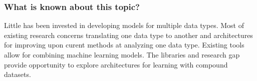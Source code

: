 \subsubsection{What is known about this topic?}

Little has been invested in developing models for multiple data types. Most of existing research concerns translating one data type to another and architectures for improving upon curent methods at analyzing one data type. Existing tools allow for combining machine learning models. The libraries and research gap provide opportunity to explore architectures for learning with compound datasets.  
